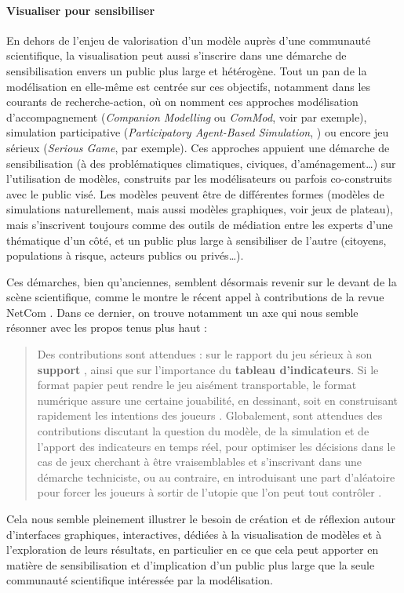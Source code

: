 \documentclass[a4paper, 12pt]{article}
\begin{document}
\paragraph{Visualiser pour sensibiliser}

En dehors de l'enjeu de valorisation d'un modèle auprès d'une communauté scientifique, la visualisation peut aussi s'inscrire dans une démarche de sensibilisation envers un public plus large et hétérogène.
Tout un pan de la modélisation en elle-même est centrée sur ces objectifs, notamment dans les courants de \og recherche-action\fg{}, où on nomment ces approches \og modélisation d'accompagnement \fg{} (\textit{Companion Modelling} ou \textit{ComMod}, voir \textcite{etienne_modelisation_2015} par exemple), \og simulation participative\fg{} (\textit{Participatory Agent-Based Simulation}, \textcite{le_page_kilt_2018}) ou encore \og jeu sérieux\fg{} (\textit{Serious Game}, \textcite{banos:hal-01861660} par exemple).
Ces approches appuient une démarche de sensibilisation (à des problématiques climatiques, civiques, d'aménagement\ldots) sur l'utilisation de modèles, construits par les modélisateurs ou parfois co-construits avec le public visé.
Les modèles peuvent être de différentes formes (modèles de simulations naturellement, mais aussi modèles graphiques, voir jeux de plateau), mais s'inscrivent toujours comme des outils de médiation entre les experts d'une thématique d'un côté, et un public plus large à sensibiliser de l'autre (citoyens, populations à risque, acteurs publics ou privés\ldots).

Ces démarches, bien qu'anciennes, semblent désormais revenir sur le devant de la scène scientifique, comme le montre le récent appel à contributions de la revue NetCom \autocite{henriot2019jeux}. Dans ce dernier, on trouve notamment un axe qui nous semble résonner avec les propos tenus plus haut :
\begin{quote}
	Des contributions sont attendues : sur le rapport du jeu sérieux à son \textbf{support} \textelp{}, ainsi que sur l'importance du \textbf{tableau d'indicateurs}. Si le format papier peut rendre le jeu aisément transportable, le format numérique assure une certaine jouabilité, en dessinant, soit en construisant rapidement les intentions des joueurs \textelp{}. Globalement, sont attendues des contributions discutant la question du modèle, de la simulation et de l'apport des indicateurs en temps réel, pour optimiser les décisions dans le cas de jeux cherchant à être vraisemblables et s'inscrivant dans une démarche techniciste, ou au contraire, en introduisant une part d'aléatoire pour forcer les joueurs à sortir de l'utopie que l'on peut tout contrôler \textelp{}.
\end{quote}
Cela nous semble pleinement illustrer le besoin de création et de réflexion autour d'interfaces graphiques, interactives, dédiées à la visualisation de modèles et à l'exploration de leurs résultats, en particulier en ce que cela peut apporter en matière de sensibilisation et d'implication d'un public plus large que la seule communauté scientifique intéressée par la modélisation. 
\end{document}
